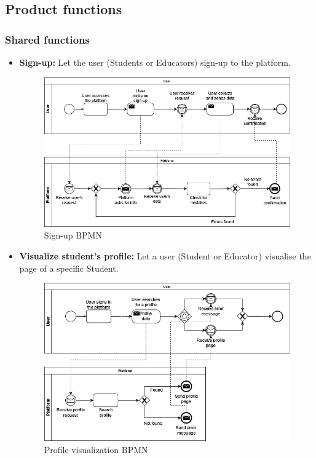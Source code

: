 \documentclass{article}
\begin{document}
{\newpage

\subsection{Product functions}
\subsubsection{Shared functions}
\begin{itemize}
    \item \textbf{Sign-up:} Let the user (Students or Educators) sign-up to the platform.
          \begin{figure}[H]
              \centering
              \includegraphics[scale=0.4]{images/BPMN/BPMN1.png}
              \caption{Sign-up BPMN}
              \label{fig:signUpBPMN}
          \end{figure}

    \item \textbf{Visualize student's profile:} Let a user (Student or Educator) visualise the page of a specific Student.
          \begin{figure}[H]
              \centering
              \includegraphics[scale=0.4]{images/BPMN/BPMN2.png}
              \caption{Profile visualization BPMN}
              \label{fig:profileVisualizationBPMN}
          \end{figure}
\end{itemize}

}
\end{document}
